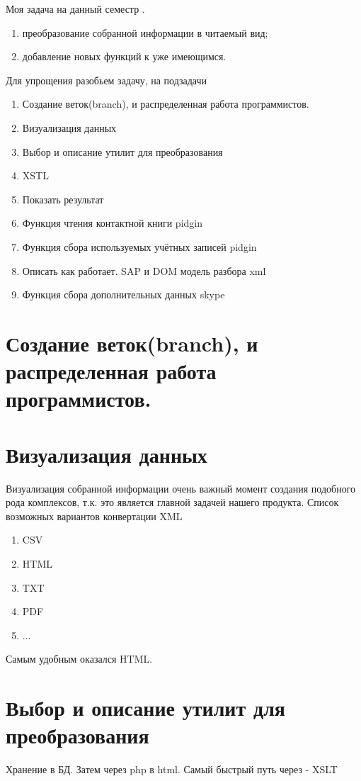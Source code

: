 \newpage
Моя задача на данный семестр . \\
\begin{enumerate}
\item преобразование собранной информации в читаемый вид;
\item добавление новых функций к уже имеющимся.
\end{enumerate}
Для упрощения разобьем задачу, на подзадачи
\begin{enumerate}
\item Создание веток(branch), и распределенная работа программистов. 
\item Визуализация данных
\item Выбор и описание утилит для преобразования
\item XSTL
\item Показать результат
\item Функция чтения контактной книги pidgin
\item Функция сбора используемых учётных записей pidgin
\item Описать как работает. SAP и DOM модель разбора xml
\item Функция сбора дополнительных данных skype
\end{enumerate}
\chapter*{Создание веток(branch), и распределенная работа программистов.} 
\chapter*{Визуализация данных}
Визуализация собранной информации очень важный момент создания подобного рода комплексов, т.к. это является главной задачей нашего продукта. 
Список возможных вариантов конвертации XML
\begin{enumerate}
\item CSV
\item HTML
\item TXT
\item PDF
\item ...
\end{enumerate}
Самым удобным оказался HTML.
\chapter*{Выбор и описание утилит для преобразования}
Хранение в БД. Затем через php в html.
Самый быстрый путь через - XSLT
